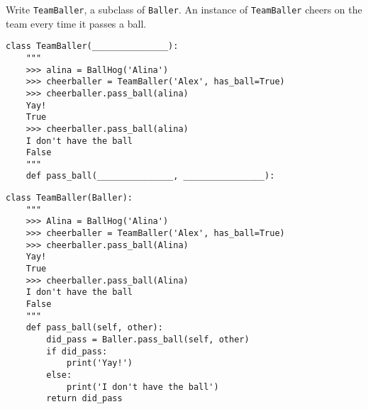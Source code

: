 \begin{blocksection}
\question Write \lstinline$TeamBaller$, a subclass of \lstinline$Baller$. An instance of \lstinline$TeamBaller$ cheers on the team every time it passes a ball.

\ifprintanswers\else
\begin{lstlisting}
class TeamBaller(_______________):
    """
    >>> alina = BallHog('Alina')
    >>> cheerballer = TeamBaller('Alex', has_ball=True)
    >>> cheerballer.pass_ball(alina)
    Yay!
    True
    >>> cheerballer.pass_ball(alina)
    I don't have the ball
    False
    """
    def pass_ball(_______________, ________________):
\end{lstlisting}
\fi

\begin{solution}[1in]
\begin{lstlisting}
class TeamBaller(Baller):
    """
    >>> Alina = BallHog('Alina')
    >>> cheerballer = TeamBaller('Alex', has_ball=True)
    >>> cheerballer.pass_ball(Alina)
    Yay!
    True
    >>> cheerballer.pass_ball(Alina)
    I don't have the ball
    False
    """
    def pass_ball(self, other):
        did_pass = Baller.pass_ball(self, other)
        if did_pass:
            print('Yay!')
        else:
            print('I don't have the ball')
        return did_pass
\end{lstlisting}
\end{solution}
\end{blocksection}
